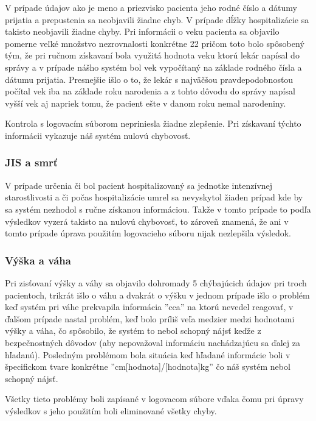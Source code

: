 V prípade údajov ako je meno a priezvisko pacienta jeho rodné číslo a dátumy prijatia a prepustenia sa neobjavili žiadne chyb. V prípade dĺžky hospitalizácie sa takisto neobjavili žiadne chyby. Pri informácii o veku pacienta sa objavilo pomerne veľké množstvo nezrovnalosti konkrétne 22 pričom toto bolo spôsobený tým, že pri ručnom získavaní bola využitá hodnota veku ktorú lekár napísal do správy a v prípade nášho systém bol vek vypočítaný na základe rodného čísla a dátumu prijatia. Presnejšie išlo o to, že lekár s najväčšou pravdepodobnosťou počítal vek iba na základe roku narodenia a z tohto dôvodu do správy napísal vyšší vek aj napriek tomu, že pacient ešte v danom roku nemal narodeniny.

Kontrola s logovacím súborom nepriniesla žiadne zlepšenie. Pri získavaní týchto informácii vykazuje náš systém nulovú chybovosť.

\subsubsection{JIS a smrť}

V prípade určenia či bol pacient hospitalizovaný sa jednotke intenzívnej starostlivosti a či počas hospitalizácie umrel sa nevyskytol žiaden prípad kde by sa systém nezhodol s ručne získanou informáciou. Takže v tomto prípade to podľa výsledkov vyzerá takisto na nulovú chybovosť, to zároveň znamená, že ani v tomto prípade úprava použitím logovacieho súboru nijak nezlepšila výsledok. 

\subsubsection{Výška a váha}

Pri zisťovaní výšky a váhy sa objavilo dohromady 5 chýbajúcich údajov pri troch pacientoch, trikrát išlo o váhu a dvakrát o výšku v jednom prípade išlo o problém keď systém pri váhe prekvapila informácia ''cca'' na ktorú nevedel reagovať, v ďalšom prípade nastal problém, keď bolo príliš veľa medzier medzi hodnotami výšky a váha, čo spôsobilo, že systém to nebol schopný nájsť keďže z bezpečnostných dôvodov (aby nepovažoval informáciu nachádzajúcu sa ďalej za hľadanú). Posledným problémom bola situácia keď hľadané informácie boli v špecifickom tvare konkrétne ''cm[hodnota]/[hodnota]kg'' čo náš systém nebol schopný nájsť.

Všetky tieto problémy boli zapísané v logovacom súbore vďaka čomu pri úpravy výsledkov s jeho použitím boli eliminované všetky chyby.

